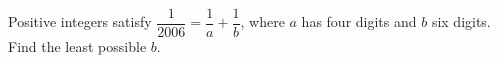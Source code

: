 Positive integers satisfy $\dfrac{1}{2006}=\dfrac{1}{a}+\dfrac{1}{b}$, where $a$ has four digits and $b$ six digits. Find the least possible $b$.
